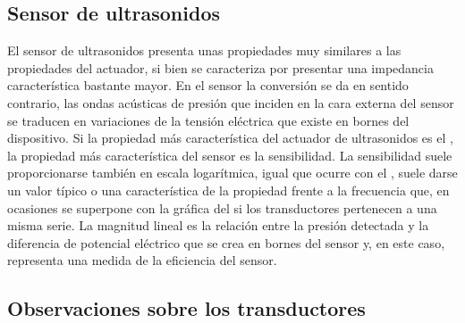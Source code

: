 \subsection{Sensor de ultrasonidos}

El sensor de ultrasonidos presenta unas propiedades muy similares a las
propiedades del actuador, si bien se caracteriza por presentar una
impedancia característica bastante mayor. En el sensor la conversión se da
en sentido contrario, las ondas acústicas de presión que inciden en la cara
externa del sensor se traducen en variaciones de la tensión eléctrica que
existe en bornes del dispositivo. Si la propiedad más característica del
actuador de ultrasonidos es el , la propiedad más característica
del sensor es la sensibilidad. La sensibilidad suele proporcionarse también
en escala logarítmica, igual que ocurre con el , suele darse un
valor típico o una característica de la propiedad frente a la frecuencia
que, en ocasiones se superpone con la gráfica del  si los
transductores pertenecen a una misma serie. La magnitud lineal es la
relación entre la presión detectada y la diferencia de potencial eléctrico
que se crea en bornes del sensor y, en este caso, representa una medida de
la eficiencia del sensor.


\subsection{Observaciones sobre los transductores}

